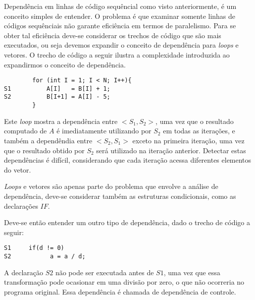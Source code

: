Dependência em linhas de código sequêncial como visto anteriormente, é um
conceito simples de entender.
O problema é que examinar somente linhas de códigos sequênciais não garante 
eficiência em termos de paralelismo. 
Para se obter tal eficiência deve-se considerar os trechos de
código que são mais executados, ou seja devemos expandir o conceito de
dependência para \textit{loops} e vetores.
O trecho de código a seguir ilustra a complexidade introduzida ao expandirmos o
conceito de dependência.

\begin{verbatim}
        for (int I = 1; I < N; I++){
S1          A[I]   = B[I] + 1;
S2          B[I+1] = A[I] - 5;
        }
\end{verbatim}

Este \textit{loop} mostra a dependência entre $<S_1,S_2>$, uma vez que o
resultado computado de $A$ é imediatamente utilizando por $S_2$ em todas as
iterações, e também a dependêndia entre $<S_2,S_1>$ exceto na primeira iteração,
uma vez que o resultado obtido por $S_2$ será utilizado na iteração anterior.
Detectar estas dependências é difícil, considerando que cada iteração acessa 
diferentes elementos do vetor.

\textit{Loops} e vetores são apenas parte do problema que envolve a análise de
dependência, deve-se considerar também as estruturas condicionais, como as
declarações $IF$.

Deve-se então entender um outro tipo de dependência, dado o trecho de
código a seguir:

\begin{verbatim}
S1     if(d != 0)
S2           a = a / d;
\end{verbatim}

A declaração $S2$ não pode ser executada antes de $S1$, uma vez que essa
transformação pode ocasionar em uma divisão por zero, o que não ocorreria no
programa original. Essa dependência é chamada de dependência de controle.




